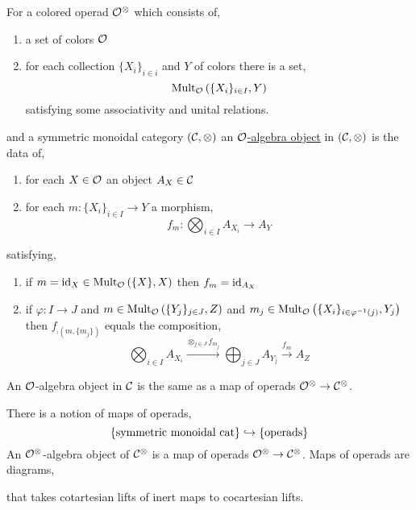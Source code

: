 \documentclass[12pt]{article}
\begin{document}
\begin{defn}
For a colored operad $\mathcal{O}^{\otimes}$ which consists of,
\begin{enumerate}
\item a set of colors $\mathcal{O}$ 
\item for each collection $\{ X_i \}_{i \in i}$ and $Y$ of colors there is a set,
\[ \mathrm{Mult}_{\mathcal{O}}\left( \{ X_i \}_{i \in I}, Y\right) \]
satisfying some associativity and unital relations. 
\end{enumerate} 
and a symmetric monoidal category $(\mathcal{C}, \otimes)$ an \underline{$\mathcal{O}$-algebra object} in $(\mathcal{C}, \otimes)$ is the data of,
\begin{enumerate}
\item for each $X \in \mathcal{O}$ an object $A_X \in \mathcal{C}$
\item for each $m : \{ X_i \}_{i \in I} \to Y$ a morphism,
\[ f_m : \bigotimes_{i \in I} A_{X_i} \to A_Y \]
\end{enumerate}
satisfying,
\begin{enumerate}
\item if $m = \mathrm{id}_X \in \mathrm{Mult}_{\mathcal{O}}\left( \{ X \} , X\right)$ then $f_m = \mathrm{id}_{A_X}$

\item if $\varphi : I \to J$ and $m \in \mathrm{Mult}_{\mathcal{O}}\left( \{ Y_j \}_{j \in J}, Z\right)$ and $m_j \in \mathrm{Mult}_{\mathcal{O}}\left( \{ X_i \}_{i \in \varphi^{-1}(j)}, Y_j\right)$ then $f_{\comp(m, \{ m_j \})}$ equals the composition,
\[ \bigotimes_{i \in I} A_{X_i} \xrightarrow{\otimes_{j \in J} f_{m_j}} \bigoplus_{j \in J} A_{Y_j} \xrightarrow{f_m} A_Z \]
\end{enumerate}
\end{defn}

\begin{rmk}
An $\mathcal{O}$-algebra object in $\mathcal{C}$ is the same as a map of operads $\mathcal{O}^\otimes \to \mathcal{C}^\otimes$. 
\end{rmk}

\begin{rmk}
There is a notion of maps of operads,
\[ \{ \text{symmetric monoidal cat} \} \hookrightarrow \{ \text{operads} \} \]
An $\mathcal{O}^\otimes$-algebra object of $\mathcal{C}^\otimes$ is a map of operads $\mathcal{O}^\otimes \to \mathcal{C}^\otimes$. Maps of operads are diagrams,
\begin{center}
\end{center}
that takes cotartesian lifts of inert maps to cocartesian lifts. 
\end{rmk}
\end{document}
